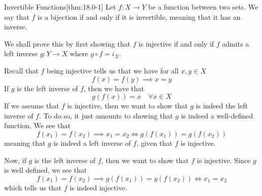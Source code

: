 \begin{thmBox}{Invertible Functions}[thm:18.0-1]
    Let \( f: X \rightarrow Y \) be a function between two sets.
    We say that \( f \) is a bijection if and only if it is invertible,
    meaning that it has an inverse.

    \baseRule

    \begin{proofBox}
        We shall prove this by first showing that \( f \) is injective if and 
        only if \( f \) admits a left inverse \( g: Y \rightarrow X \) where
        \( g \circ f = i_{ X } \). 

        \baseSkip

        Recall that \( f \) being injective tells us that we have for all 
        \( x, y \in X \)
        \begin{equation*}
            f ( x ) = f ( y ) \implies x = y
        \end{equation*}
        If \( g \) is the left inverse of \( f \), then we have that
        \begin{equation*}
            g ( f ( x ) ) = x
            \quad 
            \forall x \in X   
        \end{equation*}
        If we assume that \( f \) is injective, then we want to show that 
        \( g \) is indeed the left inverse of \( f \).
        To do so, it just amounts to showing that \( g \) is indeed a 
        well-defined function.
        We see that 
        \begin{equation*}
            f ( x_{ 1 } ) = f ( x_{ 2 } )
            \implies
            x_{ 1 } = x_{ 2 }
            \iff
            g ( f ( x_{ 1 } ) ) = g ( f ( x_{ 2 } ) )
        \end{equation*}
        meaning that \( g \) is indeed a left inverse of \( f \),
        given that \( f \) is injective.

        \baseSkip

        Now, if \( g \) is the left inverse of \( f \), then we want to show
        that \( f \) is injective.
        Since \( g \) is well defined, we see that
        \begin{equation*}
            f ( x_{ 1 } ) = f ( x_{ 2 } )
            \implies
            g ( f ( x_{ 1 } ) ) = g ( f ( x_{ 2 } ) )
            \iff 
            x_{ 1 } = x_{ 2 }
        \end{equation*}
        which tells us that \( f \) is indeed injective.

        \baseSkip


\end{proofBox}
\end{thmBox}

